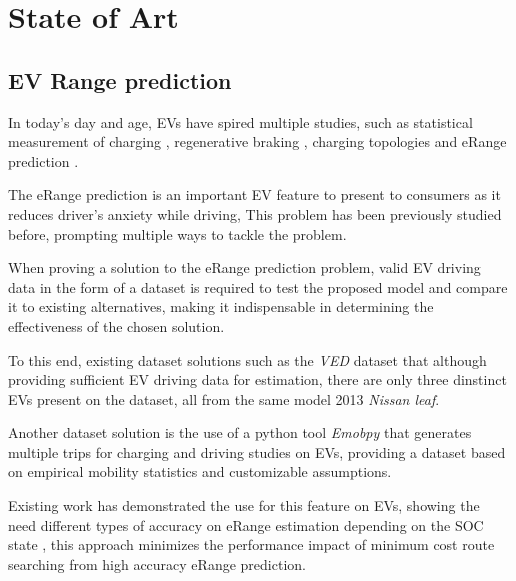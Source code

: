 \chapter{State of Art}
\label{cha:stateOfArt}

\section{EV Range prediction} 
\label{sec:stateOfArtER}

In today's day and age, \gls{EV}s have spired
multiple studies, such as statistical
measurement of charging \citep{EVScout2},
regenerative braking \citep{regenerativeBraking},
charging topologies \citep{batteryChargerTopologies} 
and \gls{eRange} prediction \citep{predictionOfeRange}.

The \gls{eRange} prediction is an important 
\gls{EV} feature to present to consumers as
it reduces driver's anxiety while driving,
This problem has been previously studied before,
prompting multiple ways to tackle the problem.

When proving a solution to the \gls{eRange}
prediction problem, valid \gls{EV} driving data 
in the form of a \gls{dataset} is required to test
the proposed model and compare it to existing
alternatives, making it indispensable in 
determining the effectiveness of the chosen 
solution.

To this end, existing \gls{dataset} solutions
such as the \textit{VED} \gls{dataset} \citep{vedDataset}
that although providing sufficient \gls{EV} driving
data for estimation, there are only three dinstinct 
\glspl{EV} present on the \gls{dataset}, all from the 
same model 2013 \textit{Nissan leaf}.


Another \gls{dataset} solution is the use of 
a \gls{python} tool \textit{Emobpy} \citep{emobpy}
that generates multiple trips for charging and driving
studies on \glspl{EV}, providing a \gls{dataset}
based on empirical mobility statistics and 
customizable assumptions.


Existing work has demonstrated the use for 
this feature on \glspl{EV}, showing the need
different types of accuracy on \gls{eRange}
estimation depending on the \gls{SOC} state \citep{eRange},
this approach minimizes the performance impact
of minimum cost route searching from high accuracy
\gls{eRange} prediction.

